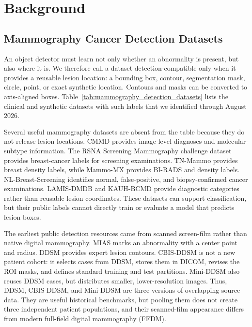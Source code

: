 \section{Background}
\label{sec:background}


\subsection{Mammography Cancer Detection Datasets}
\label{sec:mammography_datasets}

An object detector must learn not only whether an abnormality is present, but
also where it is. We therefore call a dataset detection-compatible only when it
provides a reusable lesion location: a bounding box, contour, segmentation
mask, circle, point, or exact synthetic location. Contours and masks can be
converted to axis-aligned boxes. Table~\ref{tab:mammography_detection_datasets}
lists the clinical and synthetic datasets with such labels that we identified
through August 2026.

Several useful mammography datasets are absent from the table because they do
not release lesion locations. CMMD \cite{cai2023cmmd} provides image-level
diagnoses and molecular-subtype information. The RSNA Screening Mammography
challenge dataset \cite{rsna2022smbc} provides breast-cancer labels for
screening examinations. TN-Mammo \cite{nguyen2025tnmammo} provides breast
density labels, while Mammo-MX \cite{murilloortiz2025mammomx} provides BI-RADS
and density labels. NL-Breast-Screening \cite{kendall2025nlbreast} identifies
normal, false-positive, and biopsy-confirmed cancer examinations.
LAMIS-DMDB \cite{otmani2024lamis} and KAUH-BCMD
\cite{almnayyis2025kauh} provide diagnostic categories rather than reusable
lesion coordinates. These datasets can support classification, but their public
labels cannot directly train or evaluate a model that predicts lesion boxes.

The earliest public detection resources came from scanned screen-film rather
than native digital mammography. MIAS \cite{suckling1994mias} marks an
abnormality with a center point and radius. DDSM \cite{heath2001ddsm} provides
expert lesion contours. CBIS-DDSM \cite{lee2017cbisddsm} is not a new patient
cohort: it selects cases from DDSM, stores them in DICOM, revises the ROI masks,
and defines standard training and test partitions. Mini-DDSM
\cite{lekamlage2020miniddsm} also reuses DDSM cases, but distributes smaller,
lower-resolution images. Thus, DDSM, CBIS-DDSM, and Mini-DDSM are three
versions of overlapping source data. They are useful historical benchmarks,
but pooling them does not create three independent patient populations, and
their scanned-film appearance differs from modern full-field digital
mammography (FFDM).


